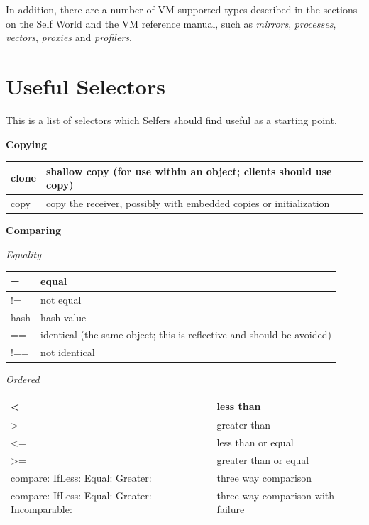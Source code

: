 \documentclass[letterpaper,10pt,english]{sphinxmanual}
\begin{document}
In addition, there are a number of VM-supported types described in the sections on the Self World
and the VM reference manual, such as \emph{mirrors}, \emph{processes}, \emph{vectors}, \emph{proxies} and \emph{profilers}.


\section{Useful Selectors}
\label{usefulselectors:useful-selectors}\label{usefulselectors::doc}
This is a list of selectors which Selfers should find useful as a starting point.

\textbf{Copying}

\begin{tabulary}{\linewidth}{p{5cm} p{10cm}}
\hline

clone
 & 
shallow copy (for use within an object; clients should use copy)
\\\hline

copy
 & 
copy the receiver, possibly with embedded copies or initialization
\\\hline
\end{tabulary}


\textbf{Comparing}

\emph{Equality}

\begin{tabulary}{\linewidth}{p{5cm} p{10cm}}
\hline

=
 & 
equal
\\\hline

!=
 & 
not equal
\\\hline

hash
 & 
hash value
\\\hline

==
 & 
identical (the same object; this is reflective and should be avoided)
\\\hline

!==
 & 
not identical
\\\hline
\end{tabulary}


\emph{Ordered}

\begin{tabulary}{\linewidth}{p{5cm} p{10cm}}
\hline

\textless{}
 & 
less than
\\\hline

\textgreater{}
 & 
greater than
\\\hline

\textless{}=
 & 
less than or equal
\\\hline

\textgreater{}=
 & 
greater than or equal
\\\hline

compare: IfLess: Equal: Greater:
 & 
three way comparison
\\\hline

compare: IfLess: Equal: Greater: Incomparable:
 & 
three way comparison with failure
\\\hline
\end{tabulary}
\end{document}
